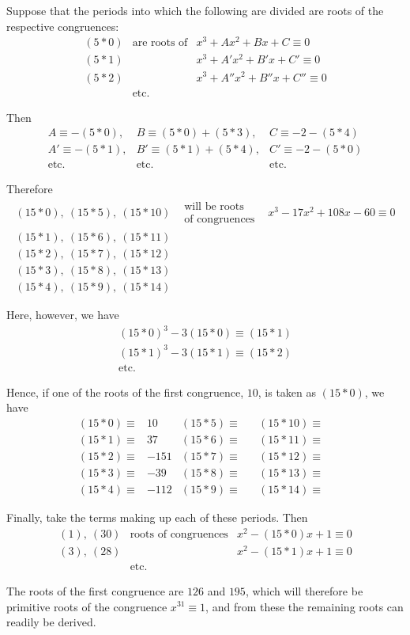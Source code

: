 Suppose that the periods into which the following are divided are roots of the respective congruences:
\[
\begin{array}{rll}
(5\ast0)&\text{are roots of}&x^3+Ax^2+Bx+C\equiv0\\
(5\ast1)&&x^3+A'x^2+B'x+C'\equiv0\\
(5\ast2)&&x^3+A''x^2+B''x+C''\equiv0\\
&\text{etc.}
\end{array}
\]

Then
\[
\begin{array}{lll}
A\equiv-(5\ast0),&B\equiv(5\ast0)+(5\ast3),&C\equiv-2-(5\ast4)\\
A'\equiv-(5\ast1),&B'\equiv(5\ast1)+(5\ast4),&C'\equiv-2-(5\ast0)\\
\text{etc.}&\text{etc.}&\text{etc.}
\end{array}
\]

Therefore
\[
\begin{array}{lll}
(15\ast0),\ (15\ast5),\ (15\ast10)&\begin{gathered}\text{will be roots}\\\text{of congruences}\end{gathered}&x^3-17x^2+108x-60\equiv0\\
(15\ast1),\ (15\ast6),\ (15\ast11)&&\\
(15\ast2),\ (15\ast7),\ (15\ast12)&&\\
(15\ast3),\ (15\ast8),\ (15\ast13)&&\\
(15\ast4),\ (15\ast9),\ (15\ast14)&&
\end{array}
\]

Here, however, we have
\[
\begin{gathered}
(15\ast0)^3-3(15\ast0)\equiv(15\ast1)\\
(15\ast1)^3-3(15\ast1)\equiv(15\ast2)\\
\text{etc.}
\end{gathered}
\]

Hence, if one of the roots of the first congruence, $10$, is taken as $(15\ast0)$, we have
\[
\begin{array}{rlrlrl}
(15\ast0)\equiv&10&(15\ast5)\equiv&& (15\ast10)\equiv&\\
(15\ast1)\equiv&37&(15\ast6)\equiv&& (15\ast11)\equiv&\\
(15\ast2)\equiv&-151&(15\ast7)\equiv&& (15\ast12)\equiv&\\
(15\ast3)\equiv&-39&(15\ast8)\equiv&& (15\ast13)\equiv&\\
(15\ast4)\equiv&-112&(15\ast9)\equiv&& (15\ast14)\equiv&
\end{array}
\]

Finally, take the terms making up each of these periods. Then
\[
\begin{array}{lll}
(1),\ (30)&\text{roots of congruences}&x^2-(15\ast0)x+1\equiv0\\
(3),\ (28)&&x^2-(15\ast1)x+1\equiv0\\
&\text{etc.}
\end{array}
\]

The roots of the first congruence are $126$ and $195$, which will therefore be primitive roots of the congruence $x^{31}\equiv1$, and from these the remaining roots can readily be derived.
